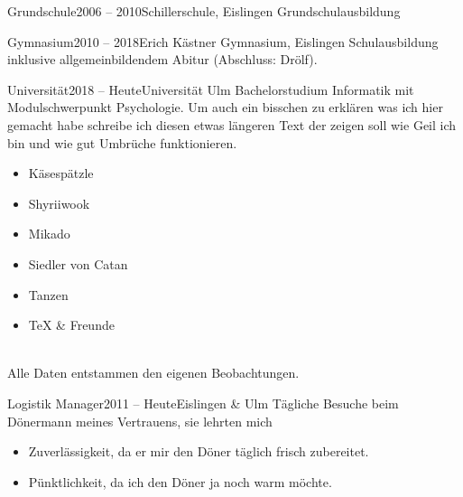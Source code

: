\documentclass[overclock]{Lilly}
\begin{document}
{{\begin{itemize}
\begin{event}{Grundschule}{2006 -- 2010}{Schillerschule, Eislingen}
        Grundschulausbildung
    \end{event}
    \begin{event}{Gymnasium}{2010 -- 2018}{Erich Kästner Gymnasium, Eislingen}
        Schulausbildung inklusive allgemeinbildendem Abitur (Abschluss: Drölf).
    \end{event}
    \begin{event}{Universität}{2018 -- Heute}{Universität Ulm}
        Bachelorstudium Informatik mit Modulschwerpunkt Psychologie. Um auch ein bisschen zu erklären was ich hier gemacht habe schreibe ich diesen etwas längeren Text der zeigen soll wie Geil ich bin und wie gut Umbrüche funktionieren.
    \end{event}
\end{itemize}}
\vfill{}%
\hskip-0.25cm\parbox{\linewidth-1cm+0.25cm}{\begin{multicols}{2}\vspace*{-\baselineskip}
    \begin{itemize}[topsep=0pt,label={\color{SignColor!75!black}\raisebox{0.5pt}{$\bullet$}},itemsep=2pt]
        \item Käsespätzle \hfill{}
        \item Shyriiwook \hfill{}
        \item Mikado \hfill{}
        \item Siedler von Catan \hfill{}
        \item Tanzen \hfill{}
        \item \TeX{} \& Freunde \hfill{}
    \end{itemize}
\end{multicols}\leavevmode{}\\[-1.5\baselineskip]\hbox{}\hfill Alle Daten entstammen den eigenen Beobachtungen.\smallskip}
\vfill{}
\hskip-0.25cm\parbox{\linewidth+0.25cm}{\begin{itemize}
\begin{event}{Logistik Manager}{2011 -- Heute}{Eislingen \& Ulm}
    Tägliche Besuche beim Dönermann meines Vertrauens, sie lehrten mich \begin{itemize}[label={\color{SignColor!25!black}\raisebox{0.75pt}{\scriptsize$\bullet$}},topsep=4pt,itemsep=2pt]
        \item Zuverlässigkeit, da er mir den Döner täglich frisch zubereitet.
        \item Pünktlichkeit, da ich den Döner ja noch warm möchte.

\end{itemize}
\end{event}
\end{itemize}}}
\end{document}
